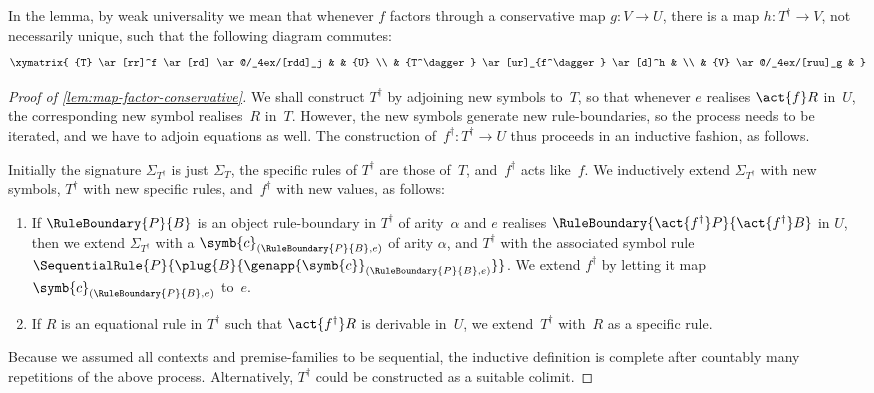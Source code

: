 In the lemma, by weak universality we mean that whenever $f$ factors through a conservative map $g : V \to U$, there is a map $h : T^\dagger \to V$, not necessarily unique, such that the following diagram commutes:
%
\begin{equation}
  \label{eq:weakly-universal-ddagger}
  \xymatrix{
    {T} \ar[rr]^f \ar[rd] \ar@/_4ex/[rdd]_j & & {U} \\
    & {T^\dagger} \ar[ur]_{f^\dagger} \ar[d]^h & \\
    & {V} \ar@/_4ex/[ruu]_g &
  }
\end{equation}

\begin{proof}[Proof of \cref{lem:map-factor-conservative}]
  We shall construct $T^\dagger$ by adjoining new symbols to~$T$, so that whenever $e$ realises $\act{f} R$ in~$U$, the corresponding new symbol realises~$R$ in~$T$. However, the new symbols generate new rule-boundaries, so the process needs to be iterated, and we have to adjoin equations as well. The construction of~$f^\dagger : T^\dagger \to U$ thus proceeds in an inductive fashion, as follows.

  Initially the signature $\Sigma_{T^\dagger}$ is just $\Sigma_T$, the specific rules of $T^\dagger$ are those of~$T$, and~$f^\dagger$ acts like~$f$.
  We inductively extend $\Sigma_{T^\dagger}$ with new symbols, $T^\dagger$ with new specific rules, and~$f^\dagger$ with new values, as follows:
  \begin{enumerate}

  \item
    If $\RuleBoundary{P}{B}$ is an object rule-boundary in $T^\dagger$ of arity~$\alpha$ and $e$ realises $\RuleBoundary{\act{f^\dagger} P}{\act{f^\dagger} B}$ in $U$, then we extend $\Sigma_{T^\dagger}$ with a  $\symb{c}_{(\RuleBoundary{P}{B},e)}$ of arity $\alpha$, and $T^\dagger$ with the associated symbol rule
    $
     \SequentialRule
       {P}
       {\plug{B}{\genapp{\symb{c}}_{(\RuleBoundary{P}{B},e)}}}
    $.
    We extend $f^\dagger$ by letting it map~$\symb{c}_{(\RuleBoundary{P}{B},e)}$ to~$e$.

  \item
    If $R$ is an equational rule in $T^\dagger$ such that $\act{f^\dagger} R$ is derivable in~$U$, we extend~$T^\dagger$ with~$R$ as a specific rule.
  \end{enumerate}
  Because we assumed all contexts and premise-families to be sequential, the inductive definition is complete after countably many repetitions of the above process. Alternatively, $T^\dagger$ could be constructed as a suitable colimit.


\end{proof}
